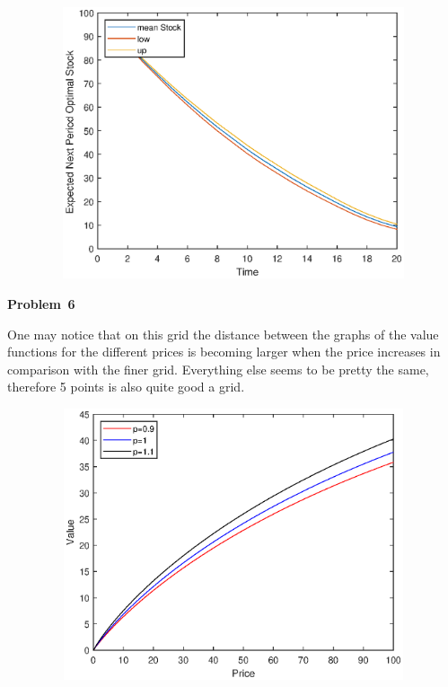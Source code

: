 \documentclass[a4paper,12pt]{article}
\begin{document}
\begin{figure}[h]
\centering
\includegraphics[width=16cm,height=8cm,keepaspectratio]{Pr5_figure.eps}
\end{figure}
\vspace{\baselineskip}
\newpage
\textbf{Problem \textnumero \,6}

One may notice that on this grid the distance between the graphs of the value functions for the different prices is becoming larger when the price increases in comparison with the finer grid. Everything else seems to be pretty the same, therefore 5 points is also quite good a grid.


\begin{figure}[h]
\centering
\includegraphics[width=16cm,height=8cm,keepaspectratio]{Pr6_figure1.eps}
\end{figure}
\end{document}
